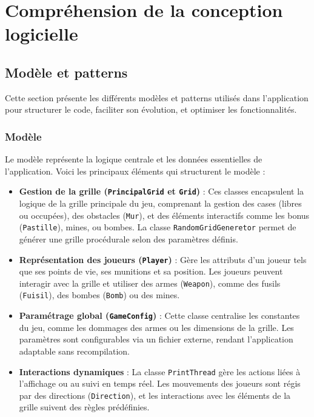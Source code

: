 \documentclass[12pt]{article}
\begin{document}
\section{Compréhension de la conception logicielle}
\subsection{Modèle et patterns}
Cette section présente les différents modèles et patterns utilisés dans l'application pour structurer le code, faciliter son évolution, et optimiser les fonctionnalités.
\subsubsection{Modèle}

Le modèle représente la logique centrale et les données essentielles de l'application. Voici les principaux éléments qui structurent le modèle :

\begin{itemize}
    \item \textbf{Gestion de la grille (\texttt{PrincipalGrid} et \texttt{Grid})} :  
    Ces classes encapsulent la logique de la grille principale du jeu, comprenant la gestion des cases (libres ou occupées), des obstacles (\texttt{Mur}), et des éléments interactifs comme les bonus (\texttt{Pastille}), mines, ou bombes.  
    La classe \texttt{RandomGridGeneretor} permet de générer une grille procédurale selon des paramètres définis.

    \item \textbf{Représentation des joueurs (\texttt{Player})} :  
    Gère les attributs d'un joueur tels que ses points de vie, ses munitions et sa position.  
    Les joueurs peuvent interagir avec la grille et utiliser des armes (\texttt{Weapon}), comme des fusils (\texttt{Fuisil}), des bombes (\texttt{Bomb}) ou des mines.

    \item \textbf{Paramétrage global (\texttt{GameConfig})} :  
    Cette classe centralise les constantes du jeu, comme les dommages des armes ou les dimensions de la grille. Les paramètres sont configurables via un fichier externe, rendant l'application adaptable sans recompilation.

    \item \textbf{Interactions dynamiques} :  
    La classe \texttt{PrintThread} gère les actions liées à l'affichage ou au suivi en temps réel. Les mouvements des joueurs sont régis par des directions (\texttt{Direction}), et les interactions avec les éléments de la grille suivent des règles prédéfinies.
\end{itemize}
\end{document}
